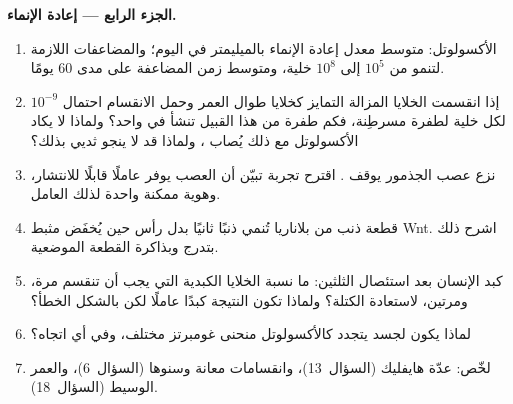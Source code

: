 \begin{problem}
\medskip
\noindent\textbf{الجزء الرابع --- إعادة الإنماء.}
\begin{enumerate}[resume]
  \item الأكسولوتل: متوسط معدل إعادة الإنماء بالميليمتر في
        اليوم؛ والمضاعفات اللازمة لتنمو  من $10^{5}$
        إلى $10^{8}$ خلية، ومتوسط زمن المضاعفة على مدى 60 يومًا.
  \item إذا انقسمت الخلايا المزالة التمايز كخلايا 
        طوال العمر وحمل الانقسام احتمال $10^{-9}$ لكل خلية
        لطفرة مسرطِنة، فكم طفرة من هذا القبيل تنشأ في 
        واحد؟ ولماذا لا يكاد الأكسولوتل مع ذلك يُصاب ،
        ولماذا قد لا ينجو ثديي بذلك؟
  \item نزع عصب الجذمور يوقف . اقترح تجربة تبيّن أن
        العصب يوفر عاملًا قابلًا للانتشار، وهوية ممكنة واحدة
        لذلك العامل.
  \item قطعة ذنب من بلاناريا تُنمي ذنبًا ثانيًا بدل رأس حين
        يُخفَض مثبط Wnt. اشرح ذلك بتدرج وبذاكرة القطعة
        الموضعية.
  \item كبد الإنسان بعد استئصال الثلثين: ما نسبة الخلايا
        الكبدية التي يجب أن تنقسم مرة، ومرتين، لاستعادة
        الكتلة؟ ولماذا تكون النتيجة كبدًا عاملًا لكن بالشكل
        الخطأ؟
  \item لماذا يكون لجسد يتجدد كالأكسولوتل منحنى غومبرتز
        مختلف، وفي أي اتجاه؟
  \item لخّص: عدّة هايفليك (السؤال~13)، وانقسامات 
        معانة  وسنوها (السؤال~6)، والعمر الوسيط
        (السؤال~18).
\end{enumerate}
\end{problem}
